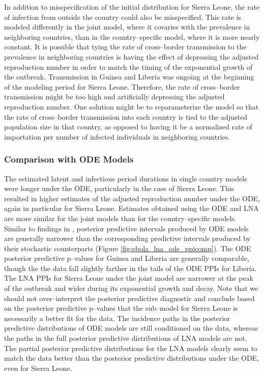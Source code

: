 In addition to misspecification of the initial distribution for Sierra Leone, the rate of infection from outside the country could also be misspecified. This rate is modeled differently in the joint model, where it covaries with the prevalence in neighboring countries, than in the country--specific model, where it is more nearly constant. It is possible that tying the rate of cross--border transmission to the prevalence in neighboring countries is having the effect of depressing the adjusted reproduction number in order to match the timing of the exponential growth of the outbreak. Transmission in Guinea and Liberia was ongoing at the beginning of the modeling period for Sierra Leone. Therefore, the rate of cross--border transmission might be too high and artificially depressing the adjusted reproduction number. One solution might be to reparameterize the model so that the rate of cross--border transmission into each country is tied to the adjusted population size in that country, as opposed to having it be a normalized rate of importation per number of infected individuals in neighboring countries. 

\subsubsection{Comparison with ODE Models}
\label{subsubsec:lna_ode_comp}

The estimated latent and infectious period durations in single country models were longer under the ODE, particularly in the case of Sierra Leone. This resulted in higher estimates of the adjusted reproduction number under the ODE, again in particular for Sierra Leone. Estimates obtained using the ODE and LNA are more similar for the joint models than for the country--specific models. Similar to findings in \cite{king2015avoidable}, posterior predictive intervals produced by ODE models are generally narrower than the corresponding predictive intervals produced by their stochastic counterparts (Figure \ref{fig:ebola_lna_ode_ppicomp}). The ODE posterior predictive p--values for Guinea and Liberia are generally comparable, though the the data fall slightly farther in the tails of the ODE PPIs for Liberia. The LNA PPIs for Sierra Leone under the joint model are narrower at the peak of the outbreak and wider during its exponential growth and decay. Note that we should not over--interpret the posterior predictive diagnostic and conclude based on the posterior predictive p--values that the sub--model for Sierra Leone is necessarily a better fit for the data. The incidence paths in the posterior predictive distributions of ODE models are still conditioned on the data, whereas the paths in the full posterior predictive distributions of LNA models are not. The partial posterior predictive distributions for the LNA models clearly seem to match the data better than the posterior predictive distributions under the ODE, even for Sierra Leone. 

